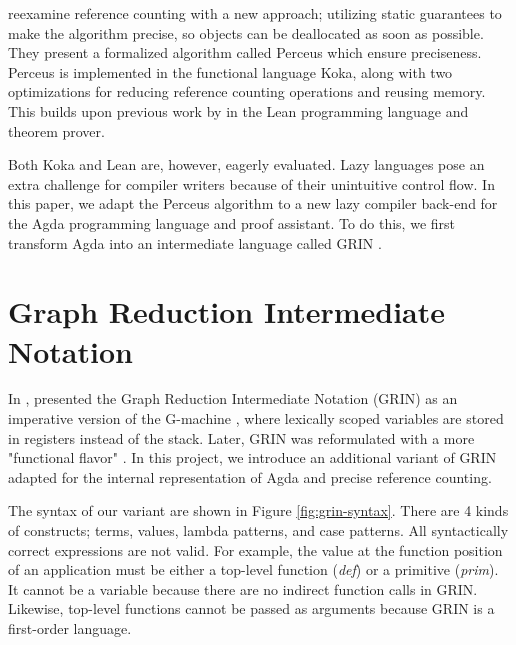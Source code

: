 \documentclass[10pt, twocolumn]{article}
\begin{document}
\citet{reinking2021} reexamine reference counting with a new approach; utilizing static guarantees to make the algorithm precise, so objects can be deallocated as soon as possible.
They present a formalized algorithm called Perceus which ensure preciseness. 
Perceus is implemented in the functional language Koka, along with two optimizations for reducing reference counting operations and reusing memory.
This builds upon previous work by \citet{ullrich2021} in the Lean programming language and theorem prover. 

Both Koka and Lean are, however, eagerly evaluated. 
Lazy languages pose an extra challenge for compiler writers because of their unintuitive control flow. 
In this paper, we adapt the Perceus algorithm to a new lazy compiler back-end for the Agda programming language and proof assistant.
To do this, we first transform Agda into an intermediate language called GRIN \citep{johnsson1991}.

\section{Graph Reduction Intermediate Notation}
In \citeyear{johnsson1991}, \citeauthor{johnsson1991} presented the Graph Reduction Intermediate Notation (GRIN) as an imperative version of the G-machine \citep{johnsson1984}, where lexically scoped variables are stored in registers instead of the stack. 
Later, GRIN was reformulated with a more "functional flavor" \citep{boquist1995}.
In this project, we introduce an additional variant of GRIN adapted for the internal representation of Agda and precise reference counting. 

The syntax of our variant are shown in Figure \ref{fig:grin-syntax}.
There are 4 kinds of constructs; terms, values, lambda patterns, and case patterns.
All syntactically correct expressions are not valid. For example, the value at the function position of an application must be either a top-level function (\emph{def}) or a primitive (\emph{prim}). It cannot be a variable because
there are no indirect function calls in GRIN. Likewise, top-level functions cannot be passed 
as arguments because GRIN is a first-order language.
\end{document}
